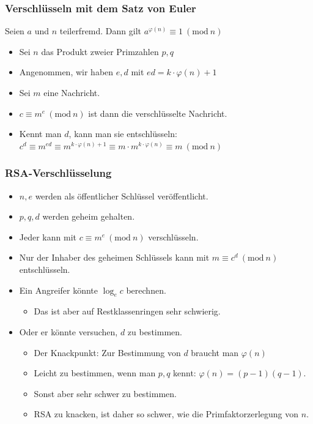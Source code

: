 \documentclass{beamer}
\begin{document}
\begin{frame}
\frametitle{Verschlüsseln mit dem Satz von Euler}

	\begin{theorem}
		Seien \(a\) und \(n\) teilerfremd.
		Dann gilt \(a^{\varphi(n)} \equiv 1 \ (\text{mod}\ n)\)
	\end{theorem}

	\begin{itemize}
		\item Sei \(n\) das Produkt zweier Primzahlen \(p,q\)
		\item Angenommen, wir haben \(e,d\) mit \(ed = k \cdot \varphi(n) + 1\)
\pause		\item Sei \(m\) eine Nachricht.
		\item \(c \equiv m^e \ (\text{mod}\ n)\) ist dann die verschlüsselte Nachricht.
\pause		\item Kennt man \(d\), kann man sie entschlüsseln: \(c^d \equiv m^{ed} \equiv m^{k \cdot \varphi(n) + 1} \equiv m \cdot m^{k \cdot \varphi(n)} \equiv m \ (\text{mod}\ n)\)
	\end{itemize}
\end{frame}

\begin{frame}
\frametitle{RSA-Verschlüsselung}

\begin{itemize}
	\item \(n, e\) werden als öffentlicher Schlüssel veröffentlicht.
	\item \(p, q, d\) werden geheim gehalten.
	\item Jeder kann mit \(c \equiv m^e\ (\text{mod}\ n)\) verschlüsseln.
	\item Nur der Inhaber des geheimen Schlüssels kann mit \(m \equiv c^d \ (\text{mod}\ n)\) entschlüsseln.
\pause	\item Ein Angreifer könnte \(\log_e c\) berechnen.
	\begin{itemize}
		\item Das ist aber auf Restklassenringen sehr schwierig.
	\end{itemize}
\pause	\item Oder er könnte versuchen, \(d\) zu bestimmen.
	\begin{itemize}
		\item Der Knackpunkt: Zur Bestimmung von \(d\) braucht man \(\varphi(n)\)
		\item Leicht zu bestimmen, wenn man \(p,q\) kennt: \(\varphi(n)=(p-1)(q-1)\).
		\item Sonst aber sehr schwer zu bestimmen.
		\item RSA zu knacken, ist daher so schwer, wie die Primfaktorzerlegung von \(n\).
	\end{itemize}
\end{itemize}
\end{frame}
\end{document}
